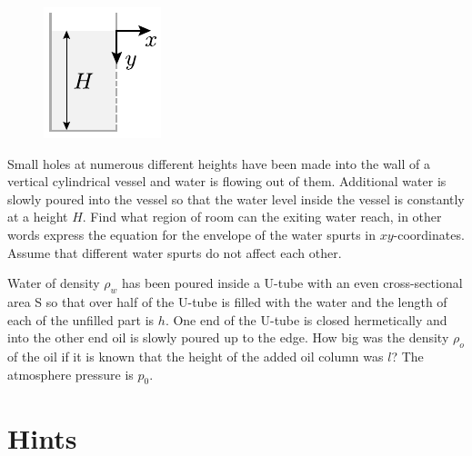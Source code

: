 \documentclass[11pt]{article}
\begin{document}

\probeng
\begin{figure}%
\vspace{-15pt}
\includegraphics[width=\linewidth]{2015-lahg-07-veejoadJoon}%
\end{figure}
Small holes at numerous different heights have been made into the wall of a vertical cylindrical vessel and water is flowing out of them. Additional water is slowly poured into the vessel so that the water level inside the vessel is constantly at a height $H$. Find what region of room can the exiting water reach, in other words express the equation for the envelope of the water spurts in $xy$-coordinates. Assume that different water spurts do not affect each other.
\probend
\bigskip


\probeng
Water of density $\rho_w$ has been poured inside a U-tube with an even cross-sectional area S so that over half of the U-tube is filled with the water and the length of each of the unfilled part is $h$. One end of the U-tube is closed hermetically and into the other end oil is slowly poured up to the edge. How big was the density $\rho_{o}$ of the oil if it is known that the height of the added oil column was $l$? The atmosphere pressure is $p_0$.
\probend
\bigskip
\newpage\normalsize\section{Hints}
        \toggleHint
        
\end{document}
